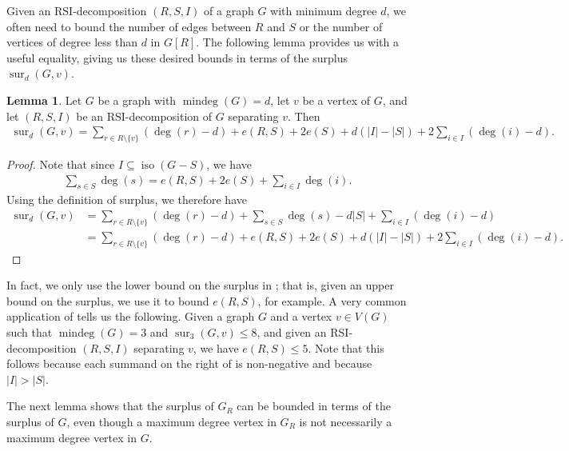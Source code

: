 \documentclass[a4paper,11pt,oneside]{scrartcl}
\theoremstyle{definition}
\newtheorem{lemma}[definition]{Lemma}
\theoremstyle{remark}
\DeclareMathOperator{\mindeg}{mindeg}
\DeclareMathOperator{\iso}{iso}
\DeclareMathOperator{\sur}{sur}
\newcommand{\surp}[3]{\sur_{#1}(#2,#3)}
\begin{document}
Given an RSI-decomposition $(R,S,I)$ of a graph $G$ with minimum degree $d$, we often need to bound the number of edges between $R$ and $S$ or the number of vertices of degree less than $d$ in $G[R]$. The following lemma provides us with a useful equality, giving us these desired bounds in terms of the surplus $\surp{d}{G}{v}$.

\begin{lemma}\label{lemma:surplus_in_RSI}
    Let $G$ be a graph with $\mindeg(G) = d$, let $v$ be a vertex of $G$, and let $(R,S,I)$ be an RSI-decomposition of $G$ separating $v$. Then 
    \begin{align}\label{align:surplus_on_RSI}
        \surp{d}{G}{v} = \sum_{r \in R \setminus \{v\}} (\deg(r) - d) + e(R,S) + 2e(S) + d(|I|-|S|) + 2 \sum_{i \in I} (\deg(i) - d).
    \end{align}
\end{lemma}
\begin{proof}
    Note that since $I \subseteq \iso(G-S)$, we have
    \begin{align*}
        \sum_{s \in S} \deg(s) = e(R,S) + 2e(S) + \sum_{i \in I} \deg(i).
    \end{align*}
    Using the definition of surplus, we therefore have
    \begin{align*}
        \surp{d}{G}{v} &=\sum_{r \in R \setminus \{v\}} (\deg(r) - d) + \sum_{s \in S} \deg(s) - d|S| + \sum_{i \in I} (\deg(i) - d)\\
        &=\sum_{r \in R \setminus \{v\}} (\deg(r) - d) + e(R,S) + 2e(S) + d(|I|-|S|) + 2 \sum_{i \in I} (\deg(i) - d).
    \end{align*}
\end{proof}
In fact, we only use the lower bound on the surplus in ; that is, given an upper bound on the surplus, we use it to bound $e(R,S)$, for example. A very common application of  tells us the following. Given a graph $G$ and a vertex $v \in V(G)$ such that $\mindeg(G) = 3$ and $\sur_3(G,v) \leq 8$, and given an RSI-decomposition $(R,S,I)$ separating $v$, we have $e(R,S) \leq 5$. Note that this follows because each summand on the right of  is non-negative and because $|I|>|S|$.

The next lemma shows that the surplus of $G_R$ can be bounded in terms of the surplus of $G$, even though a maximum degree vertex in $G_R$ is not necessarily a maximum degree vertex in $G$. 
\end{document}
